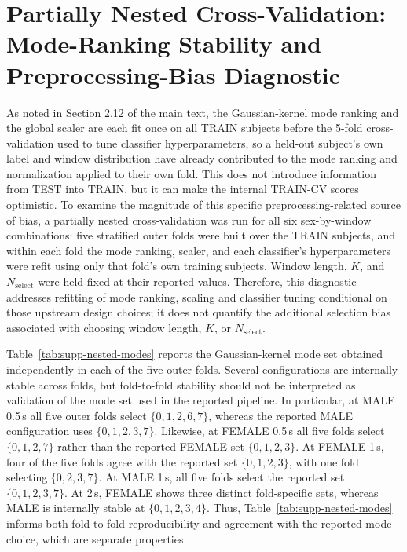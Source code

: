 \documentclass[preprint,12pt]{elsarticle}
\begin{document}
\section{Partially Nested Cross-Validation: Mode-Ranking Stability and Preprocessing-Bias Diagnostic}
\label{sec:supp-nested}

As noted in Section 2.12 of the main text, the Gaussian-kernel mode ranking and the global scaler
are each fit once on all TRAIN subjects before the 5-fold cross-validation used to tune
classifier hyperparameters, so a held-out subject's own label and window distribution have
already contributed to the mode ranking and normalization applied to their own fold. This does
not introduce information from TEST into TRAIN, but it can make the internal TRAIN-CV scores
optimistic. To examine the magnitude of this specific preprocessing-related source of bias, a
partially nested cross-validation was run for all six sex-by-window combinations: five stratified
outer folds were built over the TRAIN subjects, and within each fold the mode ranking, scaler,
and each classifier's hyperparameters were refit using only that fold's own training subjects.
Window length, $K$, and $N_{\text{select}}$ were held fixed at their reported values. Therefore,
this diagnostic addresses refitting of mode ranking, scaling and classifier tuning conditional on
those upstream design choices; it does not quantify the additional selection bias associated with
choosing window length, $K$, or $N_{\text{select}}$.

Table~\ref{tab:supp-nested-modes} reports the Gaussian-kernel mode set obtained independently in
each of the five outer folds. Several configurations are internally stable across folds, but
fold-to-fold stability should not be interpreted as validation of the mode set used in the
reported pipeline. In particular, at MALE 0.5\,s all five outer folds select
$\{0,1,2,6,7\}$, whereas the reported MALE configuration uses
$\{0,1,2,3,7\}$. Likewise, at FEMALE 0.5\,s all five folds select
$\{0,1,2,7\}$ rather than the reported FEMALE set $\{0,1,2,3\}$.
At FEMALE 1\,s, four of the five folds agree with the reported set
$\{0,1,2,3\}$, with one fold selecting $\{0,2,3,7\}$. At MALE 1\,s,
all five folds select the reported set $\{0,1,2,3,7\}$. At 2\,s,
FEMALE shows three distinct fold-specific sets, whereas MALE is internally stable at
$\{0,1,2,3,4\}$. Thus, Table~\ref{tab:supp-nested-modes} informs both fold-to-fold
reproducibility and agreement with the reported mode choice, which are separate properties.
\end{document}
